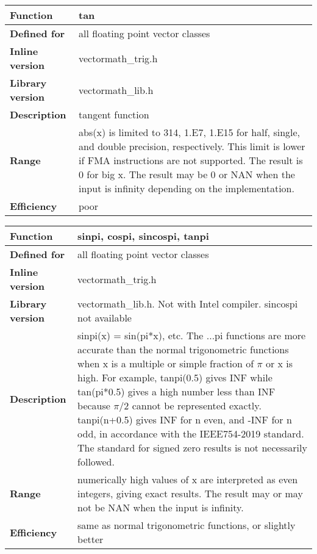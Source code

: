 \documentclass[vcl_manual.tex]{subfiles}
\begin{document}
\begin{tabular}{|p{30mm}|p{120mm}|}
\hline
\bfseries Function & tan \\ \hline
\bfseries Defined for & all floating point vector classes \\ \hline
\bfseries Inline version & vectormath\_trig.h \\ \hline
\bfseries Library version & vectormath\_lib.h \\ \hline
\bfseries Description & tangent function \\ \hline
\bfseries Range & abs(x) is limited to 314, 1.E7, 1.E15 for half, single, and double precision, respectively. This limit is lower if FMA instructions are not supported. The result is 0 for big x. The result may be 0 or NAN when the input is infinity depending on the implementation. \\ \hline
\bfseries Efficiency & poor \\ \hline
\end{tabular}

\begin{tabular}{|p{30mm}|p{120mm}|}
\hline
\bfseries Function & sinpi, cospi, sincospi, tanpi \\ \hline
\bfseries Defined for & all floating point vector classes \\ \hline
\bfseries Inline version & vectormath\_trig.h \\ \hline
\bfseries Library version & vectormath\_lib.h. Not with Intel compiler. sincospi not available \\ \hline
\bfseries Description & sinpi(x) = sin(pi*x), etc. \newline
The ...pi functions are more accurate than the normal trigonometric functions when x is a multiple or simple fraction of $\pi$ or x is high. For example, tanpi(0.5) gives INF while tan(pi*0.5) gives a high number less than INF because $\pi/2$ cannot be represented exactly. tanpi(n+0.5) gives INF for n even, and -INF for n odd, in accordance with the IEEE754-2019 standard. The standard for signed zero results is not necessarily followed. \\ \hline
\bfseries Range & numerically high values of x are interpreted as even integers, giving exact results. The result may or may not be NAN when the input is infinity. \\ \hline
\bfseries Efficiency & same as normal trigonometric functions, or slightly better \\ \hline
\end{tabular}
\end{document}
